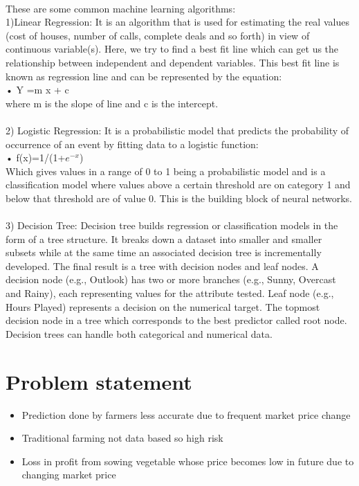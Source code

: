   \\
  These are some common machine learning algorithms:\\
1)Linear Regression: It is an algorithm that is used for estimating the real values (cost of houses, number of calls, complete deals and so forth) in view of continuous variable(s). Here, we try to find a best fit line which can get us the relationship between independent and dependent variables. This best fit line is known as regression line and can be represented by the equation:\\
•	Y =m x + c \\
where m is the slope of line and c is the intercept.\\
\\
2) Logistic Regression: It is a probabilistic model that predicts the probability of occurrence of an event by fitting data to a logistic function: \\
•	f(x)=1/(1+$e^{-x}$)\\
Which gives values in a range of 0 to 1 being a probabilistic model and is a classification model
 where values above a certain threshold are on category 1 and below that threshold are of value 0. 
 This is the building block of neural networks.\\
 \\
 3) Decision Tree: Decision tree builds regression or classification models in the form of a
  tree structure. It breaks down a dataset into smaller and smaller subsets while at the same 
  time an associated decision tree is incrementally developed. The final result is a tree with 
  decision nodes and leaf nodes. A decision node (e.g., Outlook) has two or more branches 
  (e.g., Sunny, Overcast and Rainy), each representing values for the attribute tested. 
  Leaf node (e.g., Hours Played) represents a decision on the numerical target. 
  The topmost decision node in a tree which corresponds to the best predictor called root node. 
  Decision trees can handle both categorical and numerical data.
 
  \pagebreak
\section{Problem statement}
\vspace{-18pt}
\begin{itemize}
	\item Prediction done by farmers less accurate due to frequent market price change
	\item Traditional farming not data based so high risk 
	\item Loss in profit from sowing vegetable whose price becomes low in future due to changing market price
\end{itemize}


